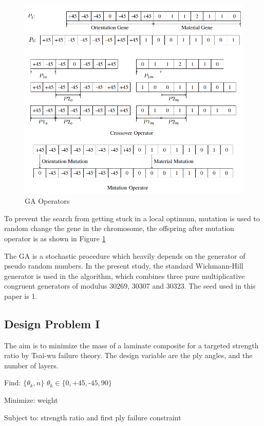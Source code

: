 \documentclass[USenglish]{article}
\begin{document}
\begin{figure}
  \includegraphics[width=\linewidth]{A_laminate_design_images/ga_operator.png}
\caption{GA Operators\label{GA:operator}}
\end{figure}

  To prevent the search from getting stuck in a local optimum, mutation is used to random change the
gene in the chromosome, the offspring after mutation operator is as shown in Figure
\ref{GA:operator}

  The GA is a stochastic procedure which heavily depends on the generator of pseudo random numbers. In
the present study, the standard Wichmann-Hill generator is used in the algorithm, which combines
three pure multiplicative congruent generators of modulus 30269, 30307 and 30323.  The seed used
in this paper is 1.

\subsection{Design Problem I}

The aim is to minimize the mass of a laminate composite for a targeted strength
ratio by Tsai-wu failure theory. The design variable are the ply angles, and the
number of layers.

Find: $\{\theta_k, n\}$ $\theta_k \in \{ 0,\text{+}45,\text{-}45,90\}$ 

Minimize: weight

Subject to: strength ratio and first ply failure constraint
\end{document}
